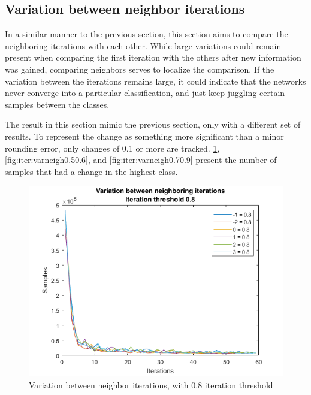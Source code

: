 \subsection{Variation between neighbor iterations}
In a similar manner to the previous section, this section aims to compare the neighboring iterations with each other.
While large variations could remain present when comparing the first iteration with the others after new information was gained, comparing neighbors serves to localize the comparison.
If the variation between the iterations remains large, it could indicate that the networks never converge into a particular classification, and just keep juggling certain samples between the classes.

The result in this section mimic the previous section, only with a different set of results.
To represent the change as something more significant than a minor rounding error, only changes of 0.1 or more are tracked.
\cref{fig:iter:varneigh0.8}, \cref{fig:iter:varneigh0.50.6}, and \cref{fig:iter:varneigh0.70.9} present the number of samples that had a change in the highest class.

\begin{figure}  %
  \centering
  \includegraphics[width=.7\textwidth]{figures/varneigh-0.8.png}
  \caption{Variation between neighbor iterations, with 0.8 iteration threshold}
  \label{fig:iter:varneigh0.8}
\end{figure}

